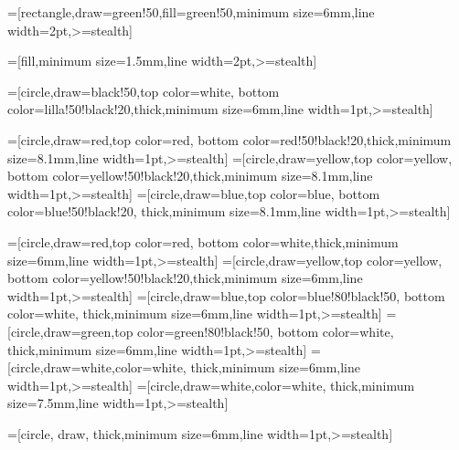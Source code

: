 =[rectangle,draw=green!50,fill=green!50,minimum size=6mm,line width=2pt,>=stealth]  %

\newcommand{\betadist}[3]{B\br{#1|#2,#3}}

=[fill,minimum size=1.5mm,line width=2pt,>=stealth]

=[circle,draw=black!50,top color=white, %
bottom color=lilla!50!black!20,thick,minimum size=6mm,line width=1pt,>=stealth]  %

=[circle,draw=red,top color=red, %
bottom color=red!50!black!20,thick,minimum size=8.1mm,line width=1pt,>=stealth]  %
=[circle,draw=yellow,top color=yellow, %
bottom color=yellow!50!black!20,thick,minimum size=8.1mm,line width=1pt,>=stealth]  %
=[circle,draw=blue,top color=blue, %
bottom color=blue!50!black!20, thick,minimum size=8.1mm,line width=1pt,>=stealth]  %

=[circle,draw=red,top color=red, %
bottom color=white,thick,minimum size=6mm,line width=1pt,>=stealth]  %
=[circle,draw=yellow,top color=yellow, %
bottom color=yellow!50!black!20,thick,minimum size=6mm,line width=1pt,>=stealth]  %
=[circle,draw=blue,top color=blue!80!black!50, %
bottom color=white, thick,minimum size=6mm,line width=1pt,>=stealth]  %
=[circle,draw=green,top color=green!80!black!50, %
bottom color=white, thick,minimum size=6mm,line width=1pt,>=stealth]  %
=[circle,draw=white,color=white, thick,minimum size=6mm,line width=1pt,>=stealth]  %
=[circle,draw=white,color=white, thick,minimum size=7.5mm,line width=1pt,>=stealth]  %

=[circle, draw,%
thick,minimum size=6mm,line width=1pt,>=stealth]  %

